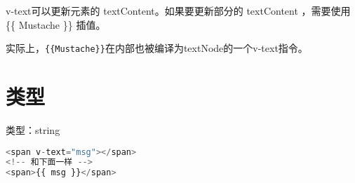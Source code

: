 v-text可以更新元素的 textContent。如果要更新部分的 textContent ，需要使用 \{\{ Mustache \}\} 插值。

实际上，\texttt{\{\{Mustache\}\}}在内部也被编译为textNode的一个v-text指令。

\section{类型}

\begin{compactitem}
\item 类型：string
\end{compactitem}


\begin{lstlisting}[language=JavaScript]
<span v-text="msg"></span>
<!-- 和下面一样 -->
<span>{{ msg }}</span>
\end{lstlisting}



\begin{lstlisting}[language=JavaScript]

\end{lstlisting}




\begin{lstlisting}[language=JavaScript]

\end{lstlisting}




\begin{lstlisting}[language=JavaScript]

\end{lstlisting}




\begin{lstlisting}[language=JavaScript]

\end{lstlisting}




\begin{lstlisting}[language=JavaScript]

\end{lstlisting}




\begin{lstlisting}[language=JavaScript]

\end{lstlisting}




\begin{lstlisting}[language=JavaScript]

\end{lstlisting}

